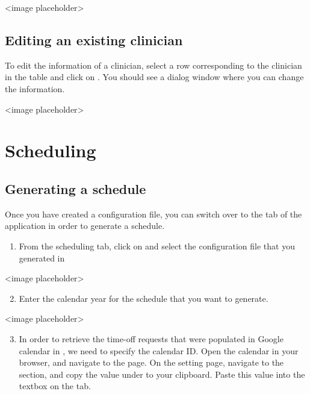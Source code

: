 \documentclass[letterpaper,10pt,english]{sphinxmanual}
\begin{document}
\textless{}image placeholder\textgreater{}


\subsection{Editing an existing clinician}
\label{\detokenize{index:editing-an-existing-clinician}}
To edit the information of a clinician, select a row corresponding
to the clinician in the table and click on . You should
see a dialog window where you can change the information.

\textless{}image placeholder\textgreater{}


\section{Scheduling}
\label{\detokenize{index:scheduling}}

\subsection{Generating a schedule}
\label{\detokenize{index:generating-a-schedule}}\label{\detokenize{index:id4}}
Once you have created a configuration file, you can switch over to the
 tab of the application in order to generate a schedule.
\begin{enumerate}
\item {} 
From the scheduling tab, click on  and select the configuration
file that you generated in {\hyperref[\detokenize{index:clinician-configuration}]{}}

\end{enumerate}

\textless{}image placeholder\textgreater{}
\begin{enumerate}
\setcounter{enumi}{1}
\item {} 
Enter the calendar year for the schedule that you want to generate.

\end{enumerate}

\textless{}image placeholder\textgreater{}
\begin{enumerate}
\setcounter{enumi}{2}
\item {} 
 In order to retrieve the time-off requests that were populated
in Google calendar in {\hyperref[\detokenize{index:adding-clinician-requests}]{}}, we need to specify the
calendar ID. Open the calendar in your browser, and navigate to the
 page.
On the setting page, navigate to the  section, and copy
the value under  to your clipboard.
Paste this value into the  textbox on the 
tab.

\end{enumerate}
\end{document}
